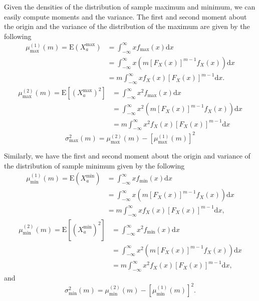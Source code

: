 \documentclass[10pt,letterpaper]{article}\usepackage[]{graphicx}\usepackage[]{color}
\begin{document}
Given the densities of the distribution of sample maximum and minimum, we can easily compute moments and the variance. The first and second moment about the origin and the variance of the distribution of the maximum are given by the following
%
\begin{equation}\label{eq:mu_max}
\begin{aligned}
\mu^{(1)}_\text{max}(m) = \text{E}(X^\text{max}_a) &= \int_{-\infty}^{\infty}x f_\text{max}(x)\text{d}x \\
&= \int_{-\infty}^{\infty}x \left(m [F_X(x)]^{m-1} f_X(x)\right)\text{d}x \\
&= m \int_{-\infty}^{\infty}x f_X(x) [F_X(x)]^{m-1}\text{d}x.
\end{aligned}
\end{equation}
%
\begin{equation}\label{eq:mu2_max}
\begin{aligned}
\mu^{(2)}_\text{max}(m) = \text{E}[(X^\text{max}_a)^2] &= \int_{-\infty}^{\infty}x^2 f_\text{max}(x)\text{d}x \\
&= \int_{-\infty}^{\infty}x^2 \left(m [F_X(x)]^{m-1} f_X(x)\right)\text{d}x \\
&= m \int_{-\infty}^{\infty}x^2 f_X(x) [F_X(x)]^{m-1}\text{d}x
\end{aligned}
\end{equation}
%
\begin{equation}\label{eq:sig_max}
\sigma^2_\text{max}(m) = \mu^{(2)}_\text{max}(m) - \left[\mu^{(1)}_\text{max}(m)\right]^2
\end{equation}

Similarly, we have the first and second moment about the origin and variance of the distribution of sample minimum given by the following
%
\begin{equation}\label{eq:mu_min}
\begin{aligned}
\mu^{(1)}_\text{min}(m) = \text{E}(X^\text{min}_a) &= \int_{-\infty}^{\infty}x f_\text{min}(x)\text{d}x \\
&= \int_{-\infty}^{\infty}x \left(m [F_X(x)]^{m-1} f_X(x)\right)\text{d}x \\
&= m \int_{-\infty}^{\infty}x f_X(x) [F_X(x)]^{m-1}\text{d}x,
\end{aligned}
\end{equation}
%
\begin{equation}\label{eq:mu2_min}
\begin{aligned}
\mu^{(2)}_\text{min}(m) = \text{E}[(X^\text{min}_a)^2] &= \int_{-\infty}^{\infty}x^2 f_\text{min}(x)\text{d}x \\
&= \int_{-\infty}^{\infty}x^2 \left(m [F_X(x)]^{m-1} f_X(x)\right)\text{d}x \\
&= m \int_{-\infty}^{\infty}x^2 f_X(x) [F_X(x)]^{m-1}\text{d}x,
\end{aligned}
\end{equation}
%
and
%
\begin{equation}\label{eq:sig_min}
\sigma^2_\text{min}(m) = \mu^{(2)}_\text{min}(m) - \left[\mu^{(1)}_\text{min}(m)\right]^2.
\end{equation}
\end{document}
